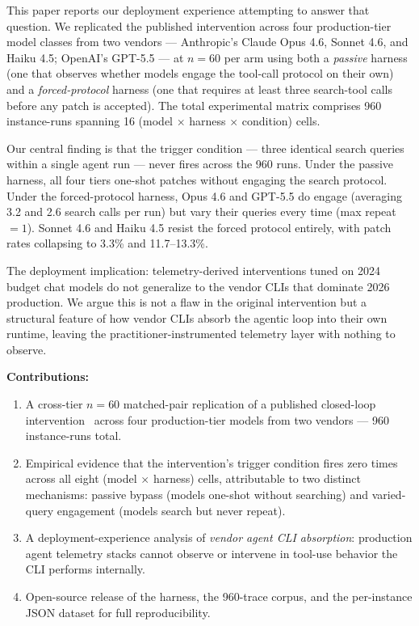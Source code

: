 \documentclass[journal]{IEEEtran}
\begin{document}
This paper reports our deployment experience attempting to answer that question. We replicated the published intervention across four production-tier model classes from two vendors --- Anthropic's Claude Opus 4.6, Sonnet 4.6, and Haiku 4.5; OpenAI's GPT-5.5 --- at $n{=}60$ per arm using both a \emph{passive} harness (one that observes whether models engage the tool-call protocol on their own) and a \emph{forced-protocol} harness (one that requires at least three search-tool calls before any patch is accepted). The total experimental matrix comprises 960 instance-runs spanning 16 (model $\times$ harness $\times$ condition) cells.

Our central finding is that the trigger condition --- three identical search queries within a single agent run --- never fires across the 960 runs. Under the passive harness, all four tiers one-shot patches without engaging the search protocol. Under the forced-protocol harness, Opus 4.6 and GPT-5.5 do engage (averaging 3.2 and 2.6 search calls per run) but vary their queries every time (max repeat $=1$). Sonnet 4.6 and Haiku 4.5 resist the forced protocol entirely, with patch rates collapsing to 3.3\% and 11.7--13.3\%.

The deployment implication: telemetry-derived interventions tuned on 2024 budget chat models do not generalize to the vendor CLIs that dominate 2026 production. We argue this is not a flaw in the original intervention but a structural feature of how vendor CLIs absorb the agentic loop into their own runtime, leaving the practitioner-instrumented telemetry layer with nothing to observe.

\textbf{Contributions:}

\begin{enumerate}[leftmargin=*,nosep]
\item A cross-tier $n{=}60$ matched-pair replication of a published closed-loop intervention~\cite{aiware2026} across four production-tier models from two vendors — 960 instance-runs total.
\item Empirical evidence that the intervention's trigger condition fires zero times across all eight (model $\times$ harness) cells, attributable to two distinct mechanisms: passive bypass (models one-shot without searching) and varied-query engagement (models search but never repeat).
\item A deployment-experience analysis of \emph{vendor agent CLI absorption}: production agent telemetry stacks cannot observe or intervene in tool-use behavior the CLI performs internally.
\item Open-source release of the harness, the 960-trace corpus, and the per-instance JSON dataset for full reproducibility.
\end{enumerate}
\end{document}
